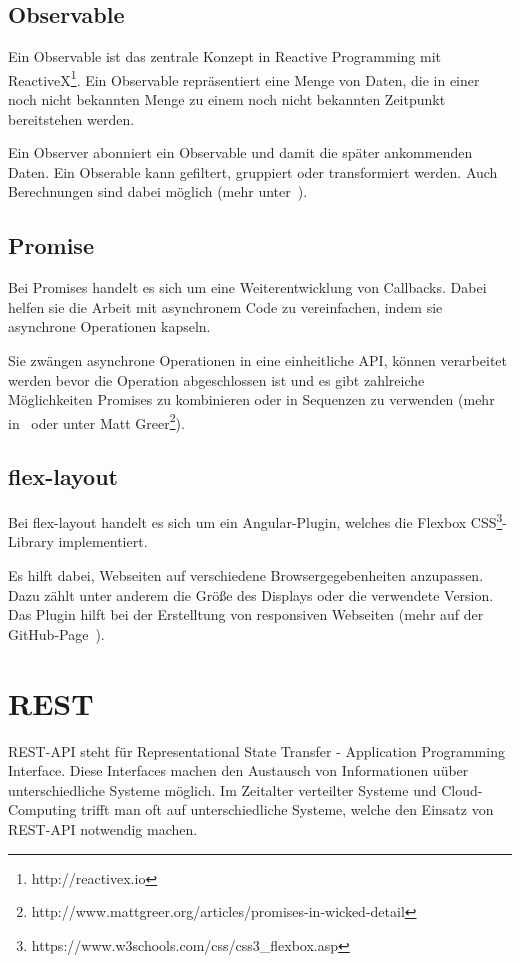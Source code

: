 \subsection{Observable}
Ein Observable ist das zentrale Konzept in Reactive Programming mit ReactiveX\footnote{http://reactivex.io}. Ein
Observable repräsentiert eine Menge von Daten, die in einer noch nicht bekannten Menge zu einem noch nicht bekannten
Zeitpunkt bereitstehen werden.

Ein Observer abonniert ein Observable und damit die später ankommenden Daten. Ein Obserable kann gefiltert, gruppiert
oder transformiert werden. Auch Berechnungen sind dabei möglich (mehr unter~\cite{book_grundlagen_observable}).

\subsection{Promise}
Bei Promises handelt es sich um eine Weiterentwicklung von Callbacks. Dabei helfen sie die Arbeit mit asynchronem Code
zu vereinfachen, indem sie asynchrone Operationen kapseln.

Sie zwängen asynchrone Operationen in eine einheitliche API, können verarbeitet werden bevor die Operation abgeschlossen
ist und es gibt zahlreiche Möglichkeiten Promises zu kombinieren oder in Sequenzen zu verwenden (mehr
in~\cite{book_grundlagen_promises} oder unter Matt Greer\footnote{http://www.mattgreer.org/articles/promises-in-wicked-detail}).

\subsection{flex-layout}
Bei flex-layout handelt es sich um ein Angular-Plugin, welches die Flexbox
CSS\footnote{https://www.w3schools.com/css/css3\_flexbox.asp}-Library implementiert.

Es hilft dabei, Webseiten auf verschiedene Browsergegebenheiten anzupassen. Dazu zählt unter anderem die Größe des
Displays oder die verwendete Version. Das Plugin hilft bei der Erstelltung von responsiven Webseiten (mehr auf der
GitHub-Page~\cite{online_grundlagen_flexlayout}).


\section{REST}
REST-API steht für Representational State Transfer - Application Programming Interface. Diese Interfaces machen den
Austausch von Informationen uüber unterschiedliche Systeme möglich. Im Zeitalter verteilter Systeme und Cloud-Computing
trifft man oft auf unterschiedliche Systeme, welche den Einsatz von REST-API notwendig machen.

